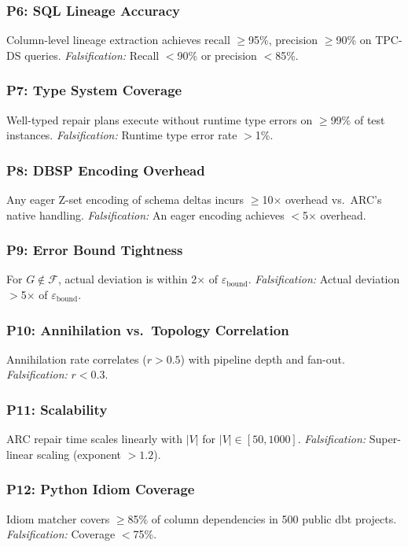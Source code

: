 \documentclass[11pt,a4paper]{article}
\theoremstyle{definition}
\newcommand{\FragF}{\mathcal{F}}
\newcommand{\ebound}{\varepsilon_{\mathrm{bound}}}
\begin{document}
\subsubsection{P6: SQL Lineage Accuracy}
Column-level lineage extraction achieves recall $\geq$95\%, precision $\geq$90\%
on TPC-DS queries.
\emph{Falsification:} Recall $<$90\% or precision $<$85\%.

\subsubsection{P7: Type System Coverage}
Well-typed repair plans execute without runtime type errors on $\geq$99\%
of test instances.
\emph{Falsification:} Runtime type error rate $>$1\%.

\subsubsection{P8: DBSP Encoding Overhead}
Any eager Z-set encoding of schema deltas incurs $\geq$10$\times$ overhead
vs.\ ARC's native handling.
\emph{Falsification:} An eager encoding achieves $<$5$\times$ overhead.

\subsubsection{P9: Error Bound Tightness}
For $G \notin \FragF$, actual deviation is within 2$\times$ of $\ebound$.
\emph{Falsification:} Actual deviation $>$5$\times$ of $\ebound$.

\subsubsection{P10: Annihilation vs.\ Topology Correlation}
Annihilation rate correlates ($r > 0.5$) with pipeline depth and fan-out.
\emph{Falsification:} $r < 0.3$.

\subsubsection{P11: Scalability}
ARC repair time scales linearly with $|V|$ for $|V| \in [50, 1000]$.
\emph{Falsification:} Super-linear scaling (exponent $> 1.2$).

\subsubsection{P12: Python Idiom Coverage}
Idiom matcher covers $\geq$85\% of column dependencies in 500 public dbt projects.
\emph{Falsification:} Coverage $<$75\%.
\end{document}
